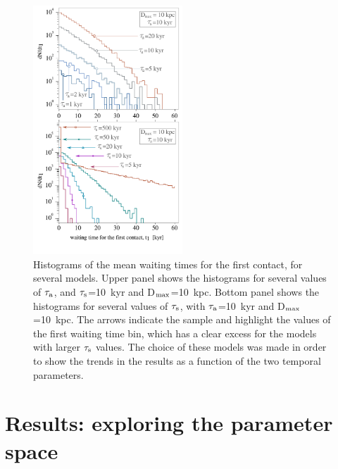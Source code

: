 \documentclass[crop]{CSLB}
\begin{document}
\begin{figure}
   \centering
   \includegraphics[width=0.5\textwidth]{F_waiting_for_1C.pdf}
   \caption{
Histograms of the mean waiting times for the first contact, for
several models.
%
   Upper panel shows the histograms for several values of $\tau_{\rm a}$, and
   $\tau_{\rm s}$=10~kyr and D$_{\rm max}$=10~kpc.
%
   Bottom panel shows the histograms for several values of $\tau_{\rm
   s}$, with $\tau_{\rm a}$=10~kyr and D$_{\rm max}$=10~kpc. The
   arrows indicate the sample and highlight the values of the first
   waiting time bin, which has a clear excess for the models with
   larger $\tau_{\rm s}$ values.
%
   The choice of these models was made in order to show the trends in
   the results as a function of the two temporal parameters.
%
   }
   \label{F_waiting_for_1C}
\end{figure}



\section{Results: exploring the parameter space}\label{S_results}
\end{document}
